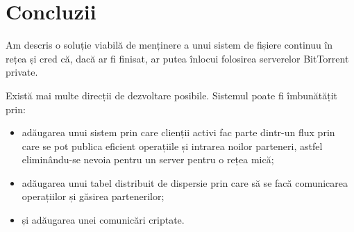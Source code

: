\documentclass[a4wide,12pt]{report}
\begin{document}
\chapter*{Concluzii}

Am descris o soluție viabilă de menținere a unui sistem de fișiere continuu în rețea și cred că, dacă ar fi finisat, ar
putea înlocui folosirea serverelor BitTorrent private.

Există mai multe direcții de dezvoltare posibile. Sistemul poate fi îmbunătățit prin:

\begin{itemize}
    \item adăugarea unui sistem prin care clienții activi fac parte dintr-un flux prin care se pot publica eficient
    operațiile și intrarea noilor parteneri, astfel eliminându-se nevoia pentru un server pentru o rețea mică;
    \item adăugarea unui tabel distribuit de dispersie prin care să se facă comunicarea operațiilor și găsirea
    partenerilor;
    \item și adăugarea unei comunicări criptate.
\end{itemize}
\end{document}
